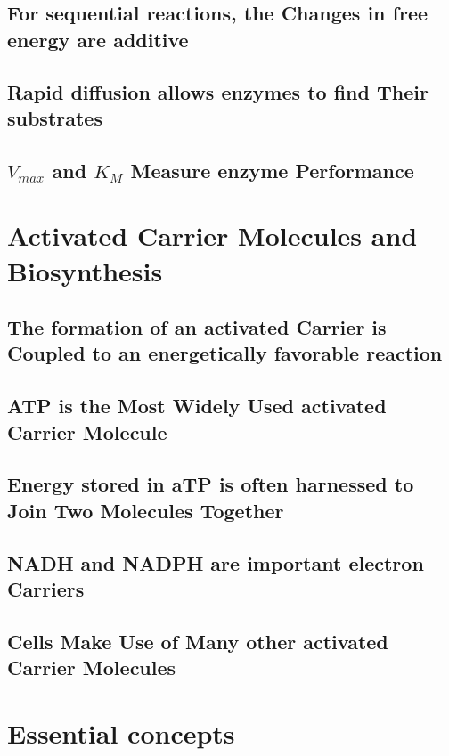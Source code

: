 \subsection{For sequential reactions, the Changes in free energy are additive}

\subsection{Rapid diffusion allows enzymes to find Their substrates}

\subsection{$V_{max}$ and $K_{M}$ Measure enzyme Performance}

\section{Activated Carrier Molecules and Biosynthesis}

\subsection{The formation of an activated Carrier is Coupled to an energetically favorable reaction}

\subsection{ATP is the Most Widely Used activated Carrier Molecule}

\subsection{Energy stored in aTP is often harnessed to Join Two Molecules Together}

\subsection{NADH and NADPH are important electron Carriers}

\subsection{Cells Make Use of Many other activated Carrier Molecules}

\section{Essential concepts}

